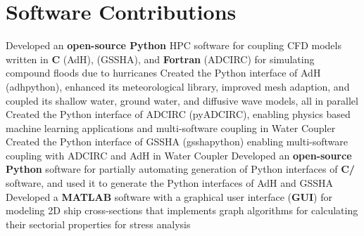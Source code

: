 \documentclass[letterpaper,10pt]{article}
\begin{document}






  \resumeSubHeadingListEnd
\vspace{-8pt}

\section{Software Contributions}
  \resumeSubItemListStart
      {Developed an \textbf{open-source Python} HPC software for coupling
      CFD models written in \textbf{C} (AdH),
      \textbf{\CC{}} (GSSHA), and \textbf{Fortran} (ADCIRC) for simulating
      compound floods due to hurricanes}
      {Created the Python interface of AdH (adhpython), enhanced its meteorological library,
      improved mesh adaption, and coupled its shallow water, ground
      water, and diffusive wave models, all in parallel}
      {Created the Python interface of ADCIRC (pyADCIRC), enabling physics
      based machine learning applications and multi-software coupling in Water
      Coupler}
      {Created the Python interface of GSSHA (gsshapython) enabling
      multi-software coupling with ADCIRC and AdH in Water Coupler}
      {Developed an \textbf{open-source Python} software for partially
      automating generation of Python interfaces of \textbf{C/\CC{}} software,
      and used it to generate the Python interfaces of AdH and GSSHA}
      {Developed a \textbf{MATLAB} software with a graphical user interface
      (\textbf{GUI}) for modeling 2D ship cross-sections that implements
      graph algorithms for calculating their sectorial properties for
      stress analysis}
  \resumeSubItemListEnd
\end{document}
